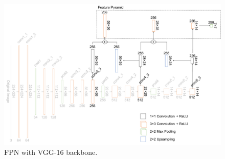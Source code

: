 \begin{figure}[!h]
	\centering
	\includegraphics[width=\fig\textwidth]{3-14.pdf}
    \caption[FPN with VGG-16 backbone]{FPN with VGG-16 backbone.}
    \label{fig:fpnvgg}
\end{figure}